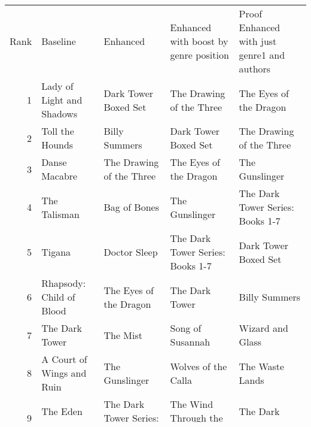\begin{tabular}{rllll}
Rank & Baseline & Enhanced & Enhanced with boost by genre position & Proof Enhanced with just genre1 and authors \\
1 & Lady of Light and Shadows & Dark Tower Boxed Set & The Drawing of the Three & The Eyes of the Dragon \\
2 & Toll the Hounds & Billy Summers & Dark Tower Boxed Set & The Drawing of the Three \\
3 & Danse Macabre & The Drawing of the Three & The Eyes of the Dragon & The Gunslinger \\
4 & The Talisman & Bag of Bones & The Gunslinger & The Dark Tower Series: Books 1-7 \\
5 & Tigana & Doctor Sleep & The Dark Tower Series: Books 1-7 & Dark Tower Boxed Set \\
6 & Rhapsody: Child of Blood & The Eyes of the Dragon & The Dark Tower & Billy Summers \\
7 & The Dark Tower & The Mist & Song of Susannah & Wizard and Glass \\
8 & A Court of Wings and Ruin & The Gunslinger & Wolves of the Calla & The Waste Lands \\
9 & The Eden Paradox & The Dark Tower Series: Books 1-7 & The Wind Through the Keyhole & The Dark Tower \\
10 & Steelheart & The Shining & Wizard and Glass & Wolves of the Calla \\
\end{tabular}
